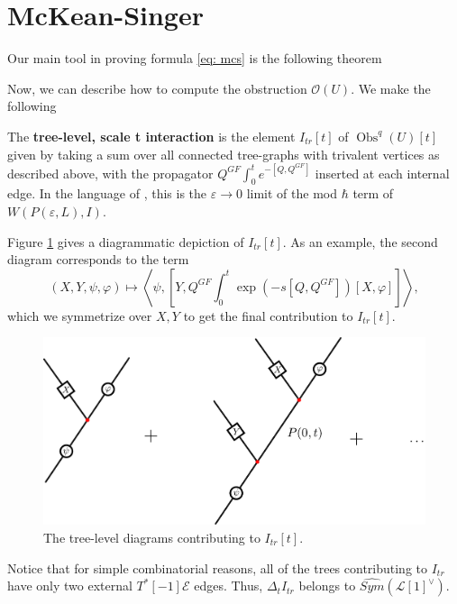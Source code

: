 \documentclass[11pt]{amsart}
\renewcommand{\epsilon}{\varepsilon}
\newcommand{\E}{\mscr{E}}
\newcommand{\mscr}{\mathscr}
\numberwithin{equation}{section}
\newcommand\Obq{\operatorname{Obs}^{q}(U)}
\renewcommand{\L}{\mathscr{L}}
\begin{document}
\section{McKean-Singer}
Our main tool in proving formula \ref{eq: mcs} is the following theorem
\begin{theorem}[Gwilliam]
\label{th: og}
\end{theorem}	
Now, we can describe how to compute the obstruction $\mathcal O(U)$. We make the following
\begin{definition}
	The \textbf{tree-level, scale t interaction} is the element $I_{tr}[t]$ of $\Obq[t]$ given by taking a sum over all connected tree-graphs with trivalent vertices as described above, with the propagator $Q^{GF}\int_0^t e^{-[Q,Q^{GF}]}$ inserted at each internal edge. In the language of \cite{ref: cost}, this is the $\epsilon \to 0$ limit of the mod $\hbar$ term of $W(P(\epsilon, L), I)$.
\end{definition}
Figure \ref{fig: trees} gives a diagrammatic depiction of $I_{tr}[t]$. As an example, the second diagram corresponds to the term
\[
(X,Y,\psi,\varphi)\mapsto \left\langle \psi, \left [ Y, Q^{GF}\int_0^t \exp{(-s[Q,Q^{GF}])}[X,\varphi]\right]\right\rangle,
\]
which we symmetrize over $X,Y$ to get the final contribution to $I_{tr}[t]$.
\begin{figure}[h]
\label{fig: trees}
\includegraphics[scale = 0.4]{Trees}
\caption{The tree-level diagrams contributing to $I_{tr}[t]$.} 
\end{figure}
Notice that for simple combinatorial reasons, all of the trees contributing to $I_{tr}$ have only two external $T^{*}[-1]\E$ edges. Thus, $\Delta_t I_{tr}$ belongs to $\widehat{Sym}(\L[1]^\vee)$. 
\end{document}
